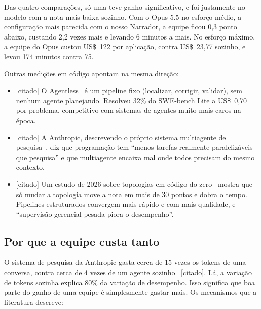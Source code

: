 \documentclass[11pt,a4paper]{article}
\newcommand{\rot}[1]{\textsf{\footnotesize[#1]}}
\begin{document}
Das quatro comparações, só uma teve ganho significativo, e foi justamente no modelo com a nota mais
baixa sozinho. Com o Opus 5.5 no esforço médio, a configuração mais parecida com o nosso Narrador, a
equipe ficou 0,3 ponto abaixo, custando 2,2 vezes mais e levando 6 minutos a mais. No esforço máximo,
a equipe do Opus custou US\$~122 por aplicação, contra US\$~23,77 sozinho, e levou 174 minutos
contra 75.

Outras medições em código apontam na mesma direção:
\begin{itemize}
  \item \rot{citado} O Agentless~\cite{agentless2024} é um pipeline fixo (localizar, corrigir,
    validar), sem nenhum agente planejando. Resolveu 32\% do SWE-bench Lite a US\$~0,70 por problema,
    competitivo com sistemas de agentes muito mais caros na época.
  \item \rot{citado} A Anthropic, descrevendo o próprio sistema multiagente de pesquisa~\cite{anthropic2025},
    diz que programação tem ``menos tarefas realmente paralelizáveis que pesquisa'' e que
    multiagente encaixa mal onde todos precisam do mesmo contexto.
  \item \rot{citado} Um estudo de 2026 sobre topologias em código do zero~\cite{topologia2026}
    mostra que só mudar a topologia move a nota em mais de 30 pontos e dobra o tempo. Pipelines
    estruturados convergem mais rápido e com mais qualidade, e ``supervisão gerencial pesada piora o
    desempenho''.
\end{itemize}

\subsection{Por que a equipe custa tanto}

O sistema de pesquisa da Anthropic gasta cerca de 15 vezes os tokens de uma conversa, contra cerca de
4 vezes de um agente sozinho~\cite{anthropic2025} \rot{citado}. Lá, a variação de tokens sozinha explica 80\% da variação
de desempenho. Isso significa que boa parte do ganho de uma equipe é simplesmente gastar mais. Os
mecanismos que a literatura descreve:
\end{document}
